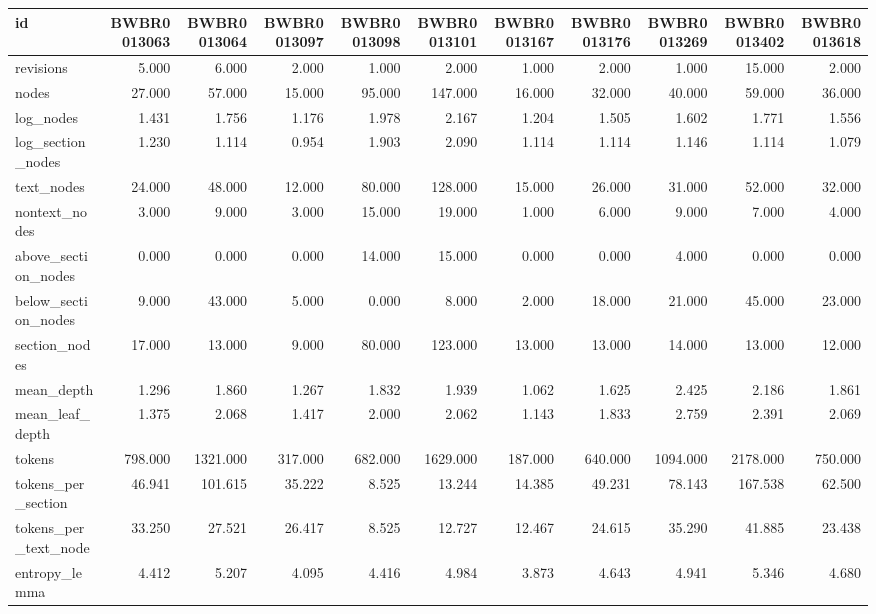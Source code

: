 \begin{tabular}{lrrrrrrrrrr}
\toprule
id & BWBR0013063 & BWBR0013064 & BWBR0013097 & BWBR0013098 & BWBR0013101 & BWBR0013167 & BWBR0013176 & BWBR0013269 & BWBR0013402 & BWBR0013618 \\
\midrule
revisions & 5.000 & 6.000 & 2.000 & 1.000 & 2.000 & 1.000 & 2.000 & 1.000 & 15.000 & 2.000 \\
\cline{1-11}
nodes & 27.000 & 57.000 & 15.000 & 95.000 & 147.000 & 16.000 & 32.000 & 40.000 & 59.000 & 36.000 \\
\cline{1-11}
log\_nodes & 1.431 & 1.756 & 1.176 & 1.978 & 2.167 & 1.204 & 1.505 & 1.602 & 1.771 & 1.556 \\
\cline{1-11}
log\_section\_nodes & 1.230 & 1.114 & 0.954 & 1.903 & 2.090 & 1.114 & 1.114 & 1.146 & 1.114 & 1.079 \\
\cline{1-11}
text\_nodes & 24.000 & 48.000 & 12.000 & 80.000 & 128.000 & 15.000 & 26.000 & 31.000 & 52.000 & 32.000 \\
\cline{1-11}
nontext\_nodes & 3.000 & 9.000 & 3.000 & 15.000 & 19.000 & 1.000 & 6.000 & 9.000 & 7.000 & 4.000 \\
\cline{1-11}
above\_section\_nodes & 0.000 & 0.000 & 0.000 & 14.000 & 15.000 & 0.000 & 0.000 & 4.000 & 0.000 & 0.000 \\
\cline{1-11}
below\_section\_nodes & 9.000 & 43.000 & 5.000 & 0.000 & 8.000 & 2.000 & 18.000 & 21.000 & 45.000 & 23.000 \\
\cline{1-11}
section\_nodes & 17.000 & 13.000 & 9.000 & 80.000 & 123.000 & 13.000 & 13.000 & 14.000 & 13.000 & 12.000 \\
\cline{1-11}
mean\_depth & 1.296 & 1.860 & 1.267 & 1.832 & 1.939 & 1.062 & 1.625 & 2.425 & 2.186 & 1.861 \\
\cline{1-11}
mean\_leaf\_depth & 1.375 & 2.068 & 1.417 & 2.000 & 2.062 & 1.143 & 1.833 & 2.759 & 2.391 & 2.069 \\
\cline{1-11}
tokens & 798.000 & 1321.000 & 317.000 & 682.000 & 1629.000 & 187.000 & 640.000 & 1094.000 & 2178.000 & 750.000 \\
\cline{1-11}
tokens\_per\_section & 46.941 & 101.615 & 35.222 & 8.525 & 13.244 & 14.385 & 49.231 & 78.143 & 167.538 & 62.500 \\
\cline{1-11}
tokens\_per\_text\_node & 33.250 & 27.521 & 26.417 & 8.525 & 12.727 & 12.467 & 24.615 & 35.290 & 41.885 & 23.438 \\
\cline{1-11}
entropy\_lemma & 4.412 & 5.207 & 4.095 & 4.416 & 4.984 & 3.873 & 4.643 & 4.941 & 5.346 & 4.680 \\

\end{tabular}
